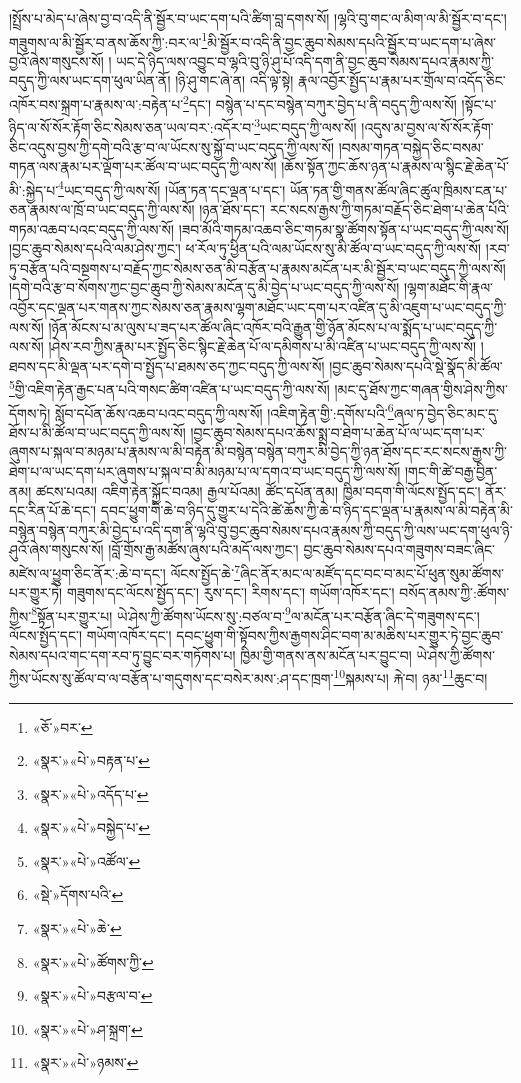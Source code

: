 །སྤྲོས་པ་མེད་པ་ཞེས་བྱ་བ་འདི་ནི་སྦྱོར་བ་ཡང་དག་པའི་ཚིག་བླ་དགས་སོ། །ལྷའི་བུ་གང་ལ་མིག་ལ་མི་སྦྱོར་བ་དང་། གཟུགས་ལ་མི་སྦྱོར་བ་ནས་ཆོས་ཀྱི་:བར་ལ་\footnote{«ཅོ་»བར་}མི་སྦྱོར་བ་འདི་ནི་བྱང་ཆུབ་སེམས་དཔའི་སྦྱོར་བ་ཡང་དག་པ་ཞེས་བྱའོ་ཞེས་གསུངས་སོ། །
ཡང་དེ་ཉིད་ལས་འབྱུང་བ་ལྷའི་བུ་ཉི་ཤུ་པོ་འདི་དག་ནི་བྱང་ཆུབ་སེམས་དཔའ་རྣམས་ཀྱི་བདུད་ཀྱི་ལས་ཡང་དག་ཕུལ་ཡིན་ནོ། །ཉི་ཤུ་གང་ཞེ་ན། འདི་ལྟ་སྟེ། རྣལ་འབྱོར་སྤྱོད་པ་རྣམ་པར་གྲོལ་བ་འདོད་ཅིང་འཁོར་བས་སྐྲག་པ་རྣམས་ལ་:བརྟེན་པ་\footnote{«སྣར་»«པེ་»བརྟན་པ་}དང་། བསྙེན་པ་དང་བསྙེན་བཀུར་བྱེད་པ་ནི་བདུད་ཀྱི་ལས་སོ། །སྟོང་པ་ཉིད་ལ་སོ་སོར་རྟོག་ཅིང་སེམས་ཅན་ཡལ་བར་:འདོར་བ་\footnote{«སྣར་»«པེ་»འདོད་པ་}ཡང་བདུད་ཀྱི་ལས་སོ། །འདུས་མ་བྱས་ལ་སོ་སོར་རྟོག་ཅིང་འདུས་བྱས་ཀྱི་དགེ་བའི་རྩ་བ་ལ་ཡོངས་སུ་སྐྱོ་བ་ཡང་བདུད་ཀྱི་ལས་སོ། །བསམ་གཏན་བསྐྱེད་ཅིང་བསམ་གཏན་ལས་རྣམ་པར་ལྡོག་པར་ཚོལ་བ་ཡང་བདུད་ཀྱི་ལས་སོ། །ཆོས་སྟོན་ཀྱང་ཆོས་ཉན་པ་རྣམས་ལ་སྙིང་རྗེ་ཆེན་པོ་མི་:སྐྱེད་པ་\footnote{«སྣར་»«པེ་»བསྐྱེད་པ་}ཡང་བདུད་ཀྱི་ལས་སོ། །ཡོན་ཏན་དང་ལྡན་པ་དང་། ཡོན་ཏན་གྱི་གནས་ཚོལ་ཞིང་ཚུལ་ཁྲིམས་ངན་པ་ཅན་རྣམས་ལ་ཁྲོ་བ་ཡང་བདུད་ཀྱི་ལས་སོ། །ཉན་ཐོས་དང་། རང་སངས་རྒྱས་ཀྱི་གཏམ་བརྗོད་ཅིང་ཐེག་པ་ཆེན་པོའི་གཏམ་འཆབ་པའང་བདུད་ཀྱི་ལས་སོ། །ཟབ་མོའི་གཏམ་འཆབ་ཅིང་གཏམ་སྣ་ཚོགས་སྟོན་པ་ཡང་བདུད་ཀྱི་ལས་སོ། །བྱང་ཆུབ་སེམས་དཔའི་ལམ་ཤེས་ཀྱང་། ཕ་རོལ་ཏུ་ཕྱིན་པའི་ལམ་ཡོངས་སུ་མི་ཚོལ་བ་ཡང་བདུད་ཀྱི་ལས་སོ། །རབ་ཏུ་བརྩོན་པའི་བསྔགས་པ་བརྗོད་ཀྱང་སེམས་ཅན་མི་བརྩོན་པ་རྣམས་མངོན་པར་མི་སྦྱོར་བ་ཡང་བདུད་ཀྱི་ལས་སོ། །དགེ་བའི་རྩ་བ་སོགས་ཀྱང་བྱང་ཆུབ་ཀྱི་སེམས་མངོན་དུ་མི་བྱེད་པ་ཡང་བདུད་ཀྱི་ལས་སོ། །ལྷག་མཐོང་གི་རྣལ་འབྱོར་དང་ལྡན་པར་གནས་ཀྱང་སེམས་ཅན་རྣམས་ལྷག་མཐོང་ཡང་དག་པར་འཛིན་དུ་མི་འཇུག་པ་ཡང་བདུད་ཀྱི་ལས་སོ། །ཉོན་མོངས་པ་མ་ལུས་པ་ཟད་པར་ཚོལ་ཞིང་འཁོར་བའི་རྒྱུན་གྱི་ཉོན་མོངས་པ་ལ་སྨོད་པ་ཡང་བདུད་ཀྱི་ལས་སོ། །ཤེས་རབ་ཀྱིས་རྣམ་པར་སྤྱོད་ཅིང་སྙིང་རྗེ་ཆེན་པོ་ལ་དམིགས་པ་མི་འཛིན་པ་ཡང་བདུད་ཀྱི་ལས་སོ། །ཐབས་དང་མི་ལྡན་པར་དགེ་བ་སྤྱོད་པ་ཐམས་ཅད་ཀྱང་བདུད་ཀྱི་ལས་སོ། །བྱང་ཆུབ་སེམས་དཔའི་སྡེ་སྣོད་མི་ཚོལ་\footnote{«སྣར་»«པེ་»འཚོལ་}གྱི་འཇིག་རྟེན་རྒྱང་པན་པའི་གསང་ཚིག་འཛིན་པ་ཡང་བདུད་ཀྱི་ལས་སོ། །མང་དུ་ཐོས་ཀྱང་གཞན་གྱིས་ཤེས་ཀྱིས་དོགས་ཏེ། སློབ་དཔོན་ཆོས་འཆབ་པའང་བདུད་ཀྱི་ལས་སོ། །འཇིག་རྟེན་གྱི་:དགོས་པའི་\footnote{«སྡེ་»དོགས་པའི་}ཞལ་ཏ་བྱེད་ཅིང་མང་དུ་ཐོས་པ་མི་ཚོལ་བ་ཡང་བདུད་ཀྱི་ལས་སོ། །བྱང་ཆུབ་སེམས་དཔའ་ཆོས་སྨྲ་བ་ཐེག་པ་ཆེན་པོ་ལ་ཡང་དག་པར་ཞུགས་པ་སྐལ་བ་མཉམ་པ་རྣམས་ལ་མི་བརྟེན་མི་བསྙེན་བསྙེན་བཀུར་མི་བྱེད་ཀྱི་ཉན་ཐོས་དང་རང་སངས་རྒྱས་ཀྱི་ཐེག་པ་ལ་ཡང་དག་པར་ཞུགས་པ་སྐལ་བ་མི་མཉམ་པ་ལ་དགའ་བ་ཡང་བདུད་ཀྱི་ལས་སོ། །གང་གི་ཚེ་བརྒྱ་བྱིན་ནམ། ཚངས་པའམ། འཇིག་རྟེན་སྐྱོང་བའམ། རྒྱལ་པོའམ། ཚོང་དཔོན་ནམ། ཁྱིམ་བདག་གི་ལོངས་སྤྱོད་དང་། ནོར་དང་རིན་པོ་ཆེ་དང་། དབང་ཕྱུག་གི་ཆེ་བ་ཉིད་དུ་གྱུར་པ་དེའི་ཚེ་ཆོས་ཀྱི་ཆེ་བ་ཉིད་དང་ལྡན་པ་རྣམས་ལ་མི་བརྟེན་མི་བསྙེན་བསྙེན་བཀུར་མི་བྱེད་པ་འདི་དག་ནི་ལྷའི་བུ་བྱང་ཆུབ་སེམས་དཔའ་རྣམས་ཀྱི་བདུད་ཀྱི་ལས་ཡང་དག་ཕུལ་ཉི་ཤུའོ་ཞེས་གསུངས་སོ། །བློ་གྲོས་རྒྱ་མཚོས་ཞུས་པའི་མདོ་ལས་ཀྱང་། བྱང་ཆུབ་སེམས་དཔའ་གཟུགས་བཟང་ཞིང་མཛེས་ལ་ཕྱུག་ཅིང་ནོར་:ཆེ་བ་དང་། ལོངས་སྤྱོད་ཆེ་\footnote{«སྣར་»«པེ་»ཆེ་}ཞིང་ནོར་མང་ལ་མཛོད་དང་བང་བ་མང་པོ་ཕུན་སུམ་ཚོགས་པར་གྱུར་ཏེ། གཟུགས་དང་ལོངས་སྤྱོད་དང་། རུས་དང་། རིགས་དང་། གཡོག་འཁོར་དང་། བསོད་ནམས་ཀྱི་:ཚོགས་ཀྱིས་\footnote{«སྣར་»«པེ་»ཚོགས་ཀྱི་}སྟོན་པར་གྱུར་པ། ཡེ་ཤེས་ཀྱི་ཚོགས་ཡོངས་སུ་:བཙལ་བ་\footnote{«སྣར་»«པེ་»བརྩལ་བ་}ལ་མངོན་པར་བརྩོན་ཞིང་དེ་གཟུགས་དང་། ལོངས་སྤྱོད་དང་། གཡོག་འཁོར་དང་། དབང་ཕྱུག་གི་སྟོབས་ཀྱིས་རྒྱགས་ཤིང་བག་མ་མཆིས་པར་གྱུར་ཏེ་བྱང་ཆུབ་སེམས་དཔའ་གང་དག་རབ་ཏུ་བྱུང་བར་གཏོགས་པ། ཁྱིམ་གྱི་གནས་ནས་མངོན་པར་བྱུང་བ། ཡེ་ཤེས་ཀྱི་ཚོགས་ཀྱིས་ཡོངས་སུ་ཚོལ་བ་ལ་བརྩོན་པ་གདུགས་དང་བསེར་མས་:ཤ་དང་ཁྲག་\footnote{«སྣར་»«པེ་»ཤ་སྐྲག་}སྐམས་པ། རྐེ་བ། ཉམ་\footnote{«སྣར་»«པེ་»ཉམས་}ཆུང་བ། 